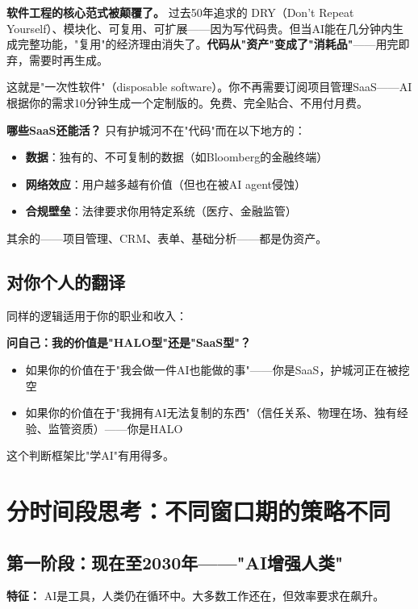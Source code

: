 \documentclass[a4paper,12pt,UTF8]{ctexart}
\begin{document}
\textbf{软件工程的核心范式被颠覆了。} 过去50年追求的 DRY（Don't Repeat Yourself）、模块化、可复用、可扩展——因为写代码贵。但当AI能在几分钟内生成完整功能，"复用"的经济理由消失了。\textbf{代码从"资产"变成了"消耗品"}——用完即弃，需要时再生成。

这就是"一次性软件"（disposable software）。你不再需要订阅项目管理SaaS——AI根据你的需求10分钟生成一个定制版的。免费、完全贴合、不用付月费。

\textbf{哪些SaaS还能活？} 只有护城河不在"代码"而在以下地方的：
\begin{itemize}
\item \textbf{数据}：独有的、不可复制的数据（如Bloomberg的金融终端）
\item \textbf{网络效应}：用户越多越有价值（但也在被AI agent侵蚀）
\item \textbf{合规壁垒}：法律要求你用特定系统（医疗、金融监管）
\end{itemize}

其余的——项目管理、CRM、表单、基础分析——都是伪资产。

\subsection{对你个人的翻译}

同样的逻辑适用于你的职业和收入：

\textbf{问自己：我的价值是"HALO型"还是"SaaS型"？}

\begin{itemize}
\item 如果你的价值在于"我会做一件AI也能做的事"——你是SaaS，护城河正在被挖空
\item 如果你的价值在于"我拥有AI无法复制的东西"（信任关系、物理在场、独有经验、监管资质）——你是HALO
\end{itemize}

这个判断框架比"学AI"有用得多。

\section{分时间段思考：不同窗口期的策略不同}

\subsection{第一阶段：现在至2030年——"AI增强人类"}

\textbf{特征：} AI是工具，人类仍在循环中。大多数工作还在，但效率要求在飙升。
\end{document}
